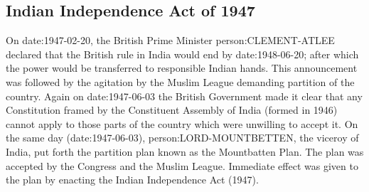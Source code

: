 \subsection{Indian Independence Act of 1947}

On \gls{date:1947-02-20}, the British Prime Minister \gls{person:CLEMENT-ATLEE} declared that the British rule in India would end by \gls{date:1948-06-20}; after which the power would be transferred to responsible Indian hands. This announcement was followed by the agitation by the Muslim League demanding partition of the country. Again on \gls{date:1947-06-03} the British Government made it clear that any Constitution framed by the Constituent Assembly of India (formed in 1946) cannot apply to those parts of the country which were unwilling to accept it. On the same day (\gls{date:1947-06-03}), \gls{person:LORD-MOUNTBETTEN}, the viceroy of India, put forth the partition plan known as the Mountbatten Plan. The plan was accepted by the Congress and the Muslim League. Immediate effect was given to the plan by enacting the Indian Independence Act (1947).

